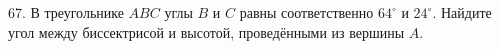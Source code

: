 67. В треугольнике $ABC$ углы $B$ и $C$ равны соответственно $64^\circ$ и $24^\circ.$ Найдите угол между биссектрисой и высотой, проведёнными из вершины $A.$\\
